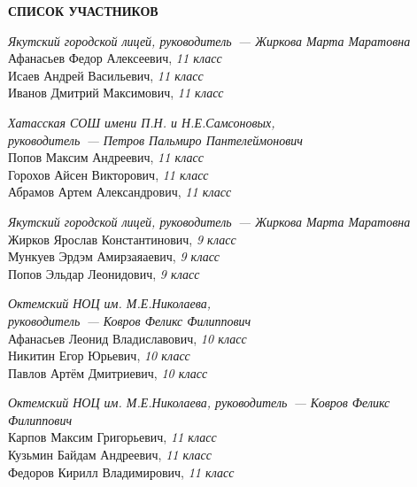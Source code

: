\noindent\textbf{СПИСОК УЧАСТНИКОВ}

\begin{description}[style=unboxed, labelwidth=\linewidth, font=\bfseries, listparindent=0pt, leftmargin=15pt, parsep=0pt]
\raggedright

\item[11 Тестировщики Java]
\textit{Якутский городской лицей, руководитель~— Жиркова Марта Маратовна} \\
Афанасьев Федор Алексеевич, \textit{11 класс} \\
Исаев Андрей Васильевич, \textit{11 класс} \\
Иванов Дмитрий Максимович, \textit{11 класс}

\item[Csmteam]
\textit{Хатасская СОШ имени П.Н. и Н.Е.Самсоновых, \\
руководитель~— Петров Пальмиро Пантелеймонович} \\
Попов Максим Андреевич, \textit{11 класс} \\
Горохов Айсен Викторович, \textit{11 класс} \\
Абрамов Артем Александрович, \textit{11 класс}

\item[Junior]
\textit{Якутский городской лицей, руководитель~— Жиркова Марта Маратовна} \\
Жирков Ярослав Константинович, \textit{9 класс} \\
Мункуев Эрдэм Амирзаяаевич, \textit{9 класс} \\
Попов Эльдар Леонидович, \textit{9 класс}

\item[Eternity Gaming]
\textit{Октемский НОЦ им. М.Е.Николаева, \\
руководитель~— Ковров Феликс Филиппович} \\
Афанасьев Леонид Владиславович, \textit{10 класс} \\
Никитин Егор Юрьевич, \textit{10 класс} \\
Павлов Артём Дмитриевич, \textit{10 класс}

\item[MVP]
\textit{Октемский НОЦ им. М.Е.Николаева, руководитель~— Ковров Феликс Филиппович} \\
Карпов Максим Григорьевич, \textit{11 класс} \\
Кузьмин Байдам Андреевич, \textit{11 класс} \\
Федоров Кирилл Владимирович, \textit{11 класс}


\end{description}
